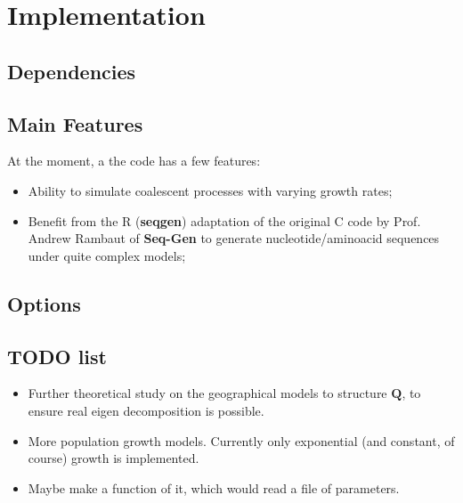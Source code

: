 \documentclass[a4paper,10pt]{article}
\begin{document}
\section{Implementation}
\subsection{Dependencies}
\subsection{Main Features}
\indent At the moment, a the code has a few features:
\begin{itemize}
 \item Ability to simulate coalescent processes with  varying  growth rates;
 \item Benefit from the R (\textbf{seqgen}) adaptation of the original C code by Prof. Andrew Rambaut of \textbf{Seq-Gen} to generate nucleotide/aminoacid sequences under quite complex models; 
\end{itemize}
\subsection{Options}
\subsection{TODO list}
\begin{itemize}
 \item Further theoretical study on the geographical models to structure $\mathbf{Q}$, to ensure real eigen decomposition is possible.
 \item More population growth models. Currently only exponential (and constant, of course) growth is implemented.
 \item Maybe make a function of it, which would read a file of parameters.
\end{itemize}


\end{document}
